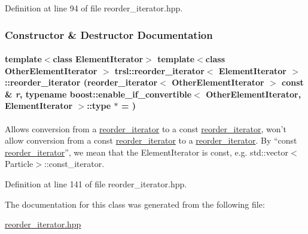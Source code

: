 Definition at line 94 of file reorder\_\-iterator.hpp.

\subsubsection{Constructor \& Destructor Documentation}
\hypertarget{classtrsl_1_1reorder__iterator_a340ad08bd47c8c21ec094a6996652e0e}{
\paragraph[{reorder\_\-iterator}]{\setlength{\rightskip}{0pt plus 5cm}template$<$class ElementIterator$>$ template$<$class OtherElementIterator $>$ {\bf trsl::reorder\_\-iterator}$<$ ElementIterator $>$::{\bf reorder\_\-iterator} ({\bf reorder\_\-iterator}$<$ OtherElementIterator $>$ const \& {\em r}, \/  typename boost::enable\_\-if\_\-convertible$<$ OtherElementIterator, ElementIterator $>$::type $\ast$ = {})}\hfill}
\label{classtrsl_1_1reorder__iterator_a340ad08bd47c8c21ec094a6996652e0e}


Allows conversion from a \hyperlink{classtrsl_1_1reorder__iterator}{reorder\_\-iterator} to a const \hyperlink{classtrsl_1_1reorder__iterator}{reorder\_\-iterator}, won't allow conversion from a const \hyperlink{classtrsl_1_1reorder__iterator}{reorder\_\-iterator} to a \hyperlink{classtrsl_1_1reorder__iterator}{reorder\_\-iterator}. By ``const \hyperlink{classtrsl_1_1reorder__iterator}{reorder\_\-iterator}'', we mean that the {\ttfamily ElementIterator} is const, e.g. {\ttfamily std::vector$<$Particle$>$::const\_\-iterator}. 

Definition at line 141 of file reorder\_\-iterator.hpp.

The documentation for this class was generated from the following file:\begin{DoxyCompactItemize}
\item 
\hyperlink{reorder__iterator_8hpp}{reorder\_\-iterator.hpp}\end{DoxyCompactItemize}
